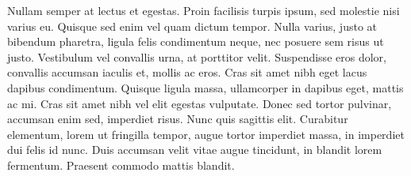 Nullam semper at lectus et egestas. Proin facilisis turpis ipsum, sed molestie nisi varius eu. Quisque sed enim vel quam dictum tempor. Nulla varius, justo at bibendum pharetra, ligula felis condimentum neque, nec posuere sem risus ut justo. Vestibulum vel convallis urna, at porttitor velit. Suspendisse eros dolor, convallis accumsan iaculis et, mollis ac eros. Cras sit amet nibh eget lacus dapibus condimentum. Quisque ligula massa, ullamcorper in dapibus eget, mattis ac mi. Cras sit amet nibh vel elit egestas vulputate. Donec sed tortor pulvinar, accumsan enim sed, imperdiet risus. Nunc quis sagittis elit. Curabitur elementum, lorem ut fringilla tempor, augue tortor imperdiet massa, in imperdiet dui felis id nunc. Duis accumsan velit vitae augue tincidunt, in blandit lorem fermentum. Praesent commodo mattis blandit.